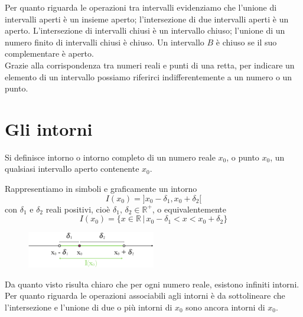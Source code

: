 Per quanto riguarda le operazioni tra intervalli evidenziamo che l'unione di 
intervalli aperti è un insieme aperto; l'intersezione di due intervalli 
aperti è un aperto. L'intersezione di intervalli chiusi è un intervallo 
chiuso; l'unione di un numero finito di intervalli chiusi è chiuso. Un 
intervallo \(B\) è chiuso se il suo complementare è aperto.\\

Grazie alla corrispondenza tra numeri reali e punti di una retta, per 
indicare un elemento di un intervallo possiamo riferirci indifferentemente a 
un numero o un punto.

%
%
\section{Gli intorni}
  \begin{definizione}
Si definisce intorno o intorno completo di un numero reale \(x_0\), o punto 
\(x_0\), un qualsiasi intervallo aperto contenente \(x_0\).\\
  \end{definizione}

Rappresentiamo in simboli e graficamente un intorno
\begin{equation}
I(x_0)=]x_0-\delta_1,x_0+\delta_2[
\end{equation}
con \(\delta_1\) e \(\delta_2\) reali positivi, cioè \(\delta_1,\,\delta_2 \in 
\mathbb{R^+}\), o equivalentemente
\begin{equation}
I(x_0)=\{x\in \mathbb{R}\,\vert\,x_0-\delta_1<x<x_0+\delta_2\}
\end{equation}
  \begin{figure}[htpb!]
  \centering
  
\includegraphics[width=0.5\textwidth]{img/top_1.png}%
  \end{figure}
  
Da quanto visto risulta chiaro che per ogni numero reale, esistono infiniti 
intorni.\\
Per quanto riguarda le operazioni associabili agli intorni è da sottolineare 
che l'intersezione e l'unione di due o più intorni di \(x_0\) sono ancora 
intorni di \(x_0\).\\


